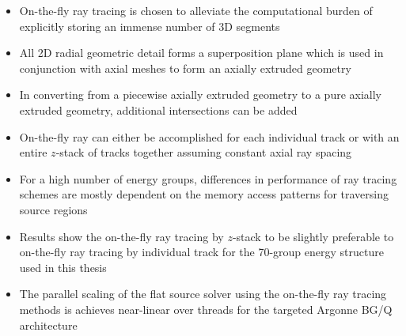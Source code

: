 \vfill
\begin{highlightsbox}[frametitle=Highlights]
\begin{itemize}
 
 \item On-the-fly ray tracing is chosen to alleviate the computational burden of explicitly storing an immense number of 3D segments

 \item All 2D radial geometric detail forms a superposition plane which is used in conjunction with axial meshes to form an axially extruded geometry
 
 \item In converting from a piecewise axially extruded geometry to a pure axially extruded geometry, additional intersections can be added

 \item On-the-fly ray can either be accomplished for each individual track or with an entire $z$-stack of tracks together assuming constant axial ray spacing
 
 \item For a high number of energy groups, differences in performance of ray tracing schemes are mostly dependent on the memory access patterns for traversing source regions

 \item Results show the on-the-fly ray tracing by $z$-stack to be slightly preferable to on-the-fly ray tracing by individual track for the 70-group energy structure used in this thesis

 \item The parallel scaling of the flat source solver using the on-the-fly ray tracing methods is achieves near-linear over threads for the targeted Argonne BG/Q architecture
 
\end{itemize}
\end{highlightsbox}
\vfill